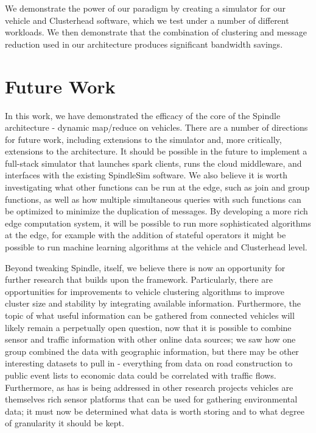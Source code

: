 \documentclass{thesis}
\begin{document}
    We demonstrate the power of our paradigm by creating a simulator for our vehicle and Clusterhead software,
    which we test under a number of different workloads. We then demonstrate that the combination of clustering
    and message reduction used in our architecture produces significant bandwidth savings.

\section{Future Work}
    In this work, we have demonstrated the efficacy of the core of the Spindle architecture - dynamic map/reduce
    on vehicles. There are a number of directions for future work, including extensions to the simulator and, 
    more critically, extensions to the architecture.
    It should be possible in the future to implement a full-stack simulator that launches spark clients, runs
    the cloud middleware, and interfaces with the existing SpindleSim software. We also believe it is worth
    investigating what other functions can be run at the edge, such as join and group functions, as well
    as how multiple simultaneous queries with such functions can be optimized to minimize the duplication
    of messages. By developing a more rich edge computation system, it will be possible to run more sophisticated
    algorithms at the edge, for example with the addition of stateful operators it might be possible to run
    machine learning algorithms at the vehicle and Clusterhead level.

    Beyond tweaking Spindle, itself, we believe there is now an opportunity for further research that builds
    upon the framework. Particularly, there are opportunities for improvements to vehicle clustering algorithms
    to improve cluster size and stability by integrating available information. Furthermore, the topic of what
    useful information can be gathered from connected vehicles will likely remain a perpetually open question,
    now that it is possible to combine sensor and traffic information with other online data sources; we saw
    how one group combined the data with geographic information, but there may be other interesting datasets
    to pull in - everything from data on road construction to public event lists to economic data could be
    correlated with traffic flows. Furthermore, as has is being addressed in other research projects %
    vehicles are themselves rich sensor platforms that can be used for gathering environmental data; it must
    now be determined what data is worth storing and to what degree of granularity it should be kept.

\begin{singlespace}


\end{singlespace}
\end{document}
